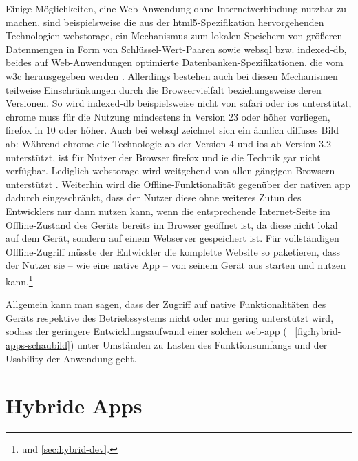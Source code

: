 Einige Möglichkeiten, eine Web-Anwendung ohne Internetverbindung nutzbar zu machen, sind beispielsweise die aus der \gls{html5}-Spezifikation hervorgehenden Technologien \gls{webstorage}, ein Mechanismus zum lokalen Speichern von größeren Datenmengen in Form von Schlüssel-Wert-Paaren \cite{w3c_webstorage} sowie \gls{websql} bzw. \gls{indexed-db}, beides auf Web-Anwendungen optimierte Datenbanken-Spezifikationen, die vom \gls{w3c} herausgegeben werden \cite{w3c_websql, w3c_indexedDB}.
Allerdings bestehen auch bei diesen Mechanismen teilweise Einschränkungen durch die Browservielfalt beziehungsweise deren Versionen. So wird \gls{indexed-db} beispielsweise nicht von \gls{safari} oder \gls{ios} unterstützt, \gls{chrome} muss für die Nutzung mindestens in Version 23 oder höher vorliegen, \gls{firefox} in 10 oder höher. 
Auch bei \gls{websql} zeichnet sich ein ähnlich diffuses Bild ab: Während \gls{chrome} die Technologie ab der Version 4 und \gls{ios} ab Version 3.2 unterstützt, ist für Nutzer der Browser \gls{firefox} und \gls{ie} die Technik gar nicht verfügbar.
Lediglich \gls{webstorage} wird weitgehend von allen gängigen Browsern unterstützt \cite{html5-rocks_offline}.
Weiterhin wird die Offline-Funktionalität gegenüber der nativen \gls{app} dadurch eingeschränkt, dass der Nutzer diese ohne weiteres Zutun des Entwicklers nur dann nutzen kann, wenn die entsprechende Internet-Seite im Offline-Zustand des Geräts bereits im Browser geöffnet ist, da diese nicht lokal auf dem Gerät, sondern auf einem Webserver gespeichert ist.
Für vollständigen Offline-Zugriff müsste der Entwickler die komplette Website so paketieren, dass der Nutzer sie -- wie eine native App -- von seinem Gerät aus starten und nutzen kann.\footnote{ und \ref{sec:hybrid-dev}.}

Allgemein kann man sagen, dass der Zugriff auf native Funktionalitäten des Geräts respektive des Betriebssystems nicht oder nur gering unterstützt wird, sodass der geringere Entwicklungsaufwand einer solchen \gls{web-app} (\seename~ \autoref{fig:hybrid-apps-schaubild}) unter Umständen zu Lasten des Funktionsumfangs und der Usability der Anwendung geht.

\section{Hybride Apps} \label{sec:hybrid-app}

